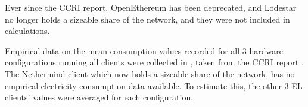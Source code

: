 \begin{table}[h]
    \centering

    \caption{An updated table of client diversity within Ethereum Mainnet network, data recorded on 27-Mar 23. Updates table 5 from report \cite{CryptoCarbonRatingsInstitute2022TheNetwork} }
  \label{Table:ClientShares}
\end{table}


Ever since the CCRI report, OpenEthereum has been deprecated, and Lodestar no longer holds a sizeable share of the network, and they were not included in calculations.  

Empirical data on the mean consumption values recorded for all 3 hardware configurations running all clients were collected in , taken from the CCRI report \cite{CryptoCarbonRatingsInstitute2022TheNetwork}. The Nethermind client which now holds a sizeable share of the network, has no empirical electricity consumption data available. To estimate this, the other 3 EL clients' values were averaged for each configuration.

